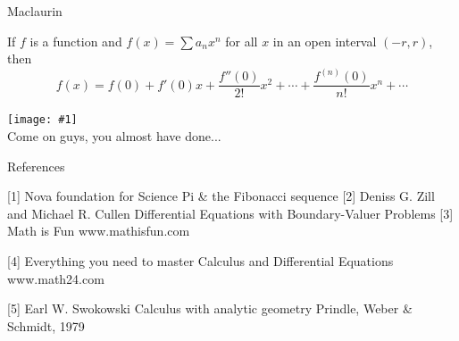 \documentclass[newPxFont]{beamer}
\newcommand \imageFrame[2]{
\begingroup
\begin{frame}
  \begin{center}
\texttt{[image: \#1]}\\
\Large #2
    \end{center}
\end{frame}
\endgroup
}
\begin{document}
\begin{frame}{Maclaurin}
  \begin{Corollary}
    If $f$ is a function and $f(x)=\sum a_nx^n$ for all $x$ in an open interval $(-r,r)$, then
    \begin{equation}
    f(x)=f(0)+f'(0)x+\frac{f''(0)}{2!}x^2+\cdots+\frac{f^{(n)}(0)}{n!}x^n+\cdots
    \end{equation}
  \end{Corollary}
\end{frame}
\imageFrame{homer_at_work}{Come on guys, you almost have done...}
\begin{frame}{References}
	\begin{thebibliography}{10}
	\beamertemplatebookbibitems
  [1] Nova foundation for Science
  \newblock Pi \& the Fibonacci sequence
  [2] Deniss G. Zill and Michael R. Cullen
	\newblock Differential Equations with Boundary-Valuer Problems
    [3] Math is Fun
	\newblock www.mathisfun.com

    [4] Everything you need to master Calculus and Differential Equations
	\newblock www.math24.com

	\beamertemplatebookbibitems
	[5] Earl W. Swokowski
	\newblock Calculus with analytic geometry
	\newblock Prindle, Weber \& Schmidt, 1979

  \end{thebibliography}
\end{frame}
\end{document}
